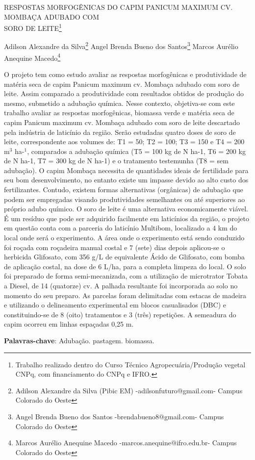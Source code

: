 \documentclass[article,12pt,onesidea,4paper,english,brazil]{abntex2}
\begin{document}
	
	
	\frenchspacing 
	
	\begin{center}
		\LARGE RESPOSTAS MORFOGÊNICAS DO CAPIM PANICUM MAXIMUM CV. MOMBAÇA
		ADUBADO COM\\SORO DE LEITE\footnote{Trabalho realizado dentro do Curso Técnico Agropecuária/Produção vegetal CNPq, com
			financiamento do CNPq e IFRO.}
		
		\normalsize
		Adilson Alexandre da Silva\footnote{Adilson Alexandre da Silva (Pibic EM) -adilsonfuturo@gmail.com- Campus Colorado do Oeste} 
		Angel Brenda Bueno dos Santos\footnote{Angel Brenda Bueno dos Santos -brendabueno8@gmail.com- Campus Colorado do Oeste} 
	Marcos Aurélio Anequine Macedo\footnote{Marcos Aurélio Anequine Macedo -marcos.anequine@ifro.edu.br- Campus Colorado do Oeste} 
	\end{center}
	
	\noindent  O projeto tem como estudo avaliar as respostas morfogênicas e produtividade de matéria
	seca de capim Panicum maximum cv. Mombaça adubado com soro de leite. Assim comparado a
	produtividade com resultados obtidos de produção do mesmo, submetido a adubação química. Nesse
	contexto, objetiva-se com este trabalho avaliar as respostas morfogênicas, biomassa verde e matéria
	seca de capim Panicum maximum cv. Mombaça adubado com soro de leite descartado pela indústria
	de laticínio da região. Serão estudadas quatro doses de soro de leite, correspondente aos volumes
	de: T1 = 50; T2 = 100; T3 = 150 e T4 = 200 m$^3$ ha-$^1$, comparados a adubação química (T5 = 100 kg
	de N ha-1, T6 = 200 kg de N ha-1, T7 = 300 kg de N ha-1) e o tratamento testemunha (T8 = sem
	adubação).
	O capim Mombaça necessita de quantidades ideais de fertilidade para seu bom
	desenvolvimento, no entanto existe um impasse devido ao alto custo dos fertilizantes. Contudo,
	existem formas alternativas (orgânicas) de adubação que podem ser empregadas visando
	produtividades semelhantes ou até superiores ao próprio adubo químico. O soro de leite é uma
	alternativa economicamente viável. É um resíduo que pode ser adquirido facilmente em laticínios da
	região, o projeto em questão conta com a parceria do laticínio Multibom, localizado a 4 km do local
	onde será o experimento.
	A área onde o experimento está sendo conduzido foi roçada com roçadeira manual costal e 7
	(sete) dias depois aplicou-se o herbicida Glifosato, com 356 g/L de equivalente Ácido de Glifosato,
	com bomba de aplicação costal, na dose de 6 L/ha, para a completa limpeza do local. O solo foi
	preparado de forma semi-mecanizada, com a utilização de microtrator Tobata a Diesel, de 14
	(quatorze) cv. A palhada resultante foi incorporada ao solo no momento do seu preparo. As parcelas
	foram delimitadas com estacas de madeira e utilizando o delineamento experimental em blocos
	casualisados (DBC) e constituindo-se de 8 (oito) tratamentos e 3 (três) repetições. A semeadura do
	capim ocorreu em linhas espaçadas 0,25 m.
	\vspace{\onelineskip}
	
	\noindent
	\textbf{Palavras-chave}: Adubação. pastagem. biomassa.
	
\end{document}

